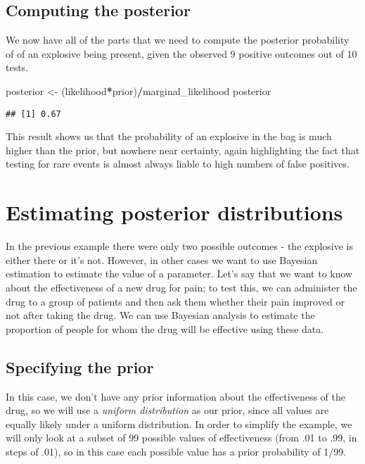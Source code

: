\documentclass[]{book}
\newenvironment{Shaded}{\begin{snugshade}}{\end{snugshade}}
\newcommand{\StringTok}[1]{\textcolor[rgb]{0.31,0.60,0.02}{#1}}
\newcommand{\OperatorTok}[1]{\textcolor[rgb]{0.81,0.36,0.00}{\textbf{#1}}}
\newcommand{\NormalTok}[1]{#1}
\theoremstyle{definition}
\theoremstyle{definition}
\theoremstyle{definition}
\theoremstyle{remark}
\begin{document}
\subsection{Computing the posterior}\label{computing-the-posterior}

We now have all of the parts that we need to compute the posterior
probability of of an explosive being present, given the observed 9
positive outcomes out of 10 tests.

\begin{Shaded}
\begin{Highlighting}[]
\NormalTok{posterior <-}\StringTok{ }\NormalTok{(likelihood}\OperatorTok{*}\NormalTok{prior)}\OperatorTok{/}\NormalTok{marginal_likelihood}
\NormalTok{posterior}
\end{Highlighting}
\end{Shaded}

\begin{verbatim}
## [1] 0.67
\end{verbatim}

This result shows us that the probability of an explosive in the bag is
much higher than the prior, but nowhere near certainty, again
highlighting the fact that testing for rare events is almost always
liable to high numbers of false positives.

\section{Estimating posterior
distributions}\label{estimating-posterior-distributions}

In the previous example there were only two possible outcomes - the
explosive is either there or it's not. However, in other cases we want
to use Bayesian estimation to estimate the value of a parameter. Let's
say that we want to know about the effectiveness of a new drug for pain;
to test this, we can administer the drug to a group of patients and then
ask them whether their pain improved or not after taking the drug. We
can use Bayesian analysis to estimate the proportion of people for whom
the drug will be effective using these data.

\subsection{Specifying the prior}\label{specifying-the-prior-1}

In this case, we don't have any prior information about the
effectiveness of the drug, so we will use a \emph{uniform distribution}
as our prior, since all values are equally likely under a uniform
distribution. In order to simplify the example, we will only look at a
subset of 99 possible values of effectiveness (from .01 to .99, in steps
of .01), so in this case each possible value has a prior probability of
1/99.
\end{document}
